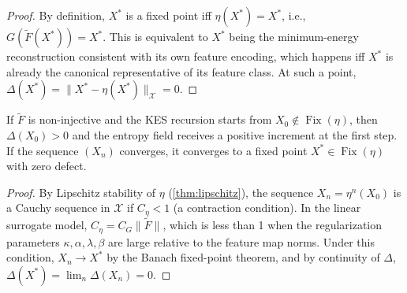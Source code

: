 \documentclass[12pt, oneside]{memoir}
\DeclareMathOperator{\Fix}{Fix}
\newcommand{\X}{\mathcal{X}}
\newcommand{\Ft}{\widetilde{F}}
\newcommand{\nnorm}[1]{\lVert #1 \rVert}
\begin{document}
\begin{proof}
By definition, $X^*$ is a fixed point iff $\eta(X^*) = X^*$, i.e., $G(\Ft(X^*)) =
X^*$.  This is equivalent to $X^*$ being the minimum-energy reconstruction consistent
with its own feature encoding, which happens iff $X^*$ is already the canonical
representative of its feature class.  At such a point, $\Delta(X^*) = \nnorm{X^* -
\eta(X^*)}_\X = 0$.
\end{proof}

\begin{corollary}
\label{cor:kes-conv}
If $\Ft$ is non-injective and the KES recursion starts from $X_0 \notin \Fix(\eta)$,
then $\Delta(X_0) > 0$ and the entropy field receives a positive increment at the first
step.  If the sequence $(X_n)$ converges, it converges to a fixed point $X^* \in
\Fix(\eta)$ with zero defect.
\end{corollary}

\begin{proof}
By Lipschitz stability of $\eta$ (\cref{thm:lipschitz}), the sequence $X_n = \eta^n(X_0)$
is a Cauchy sequence in $\X$ if $C_\eta < 1$ (a contraction condition).  In the linear
surrogate model, $C_\eta = C_G \nnorm{\Ft}$, which is less than 1 when the regularization
parameters $\kappa, \alpha, \lambda, \beta$ are large relative to the feature map norms.
Under this condition, $X_n \to X^*$ by the Banach fixed-point theorem, and by continuity
of $\Delta$, $\Delta(X^*) = \lim_n \Delta(X_n) = 0$.
\end{proof}
\end{document}
